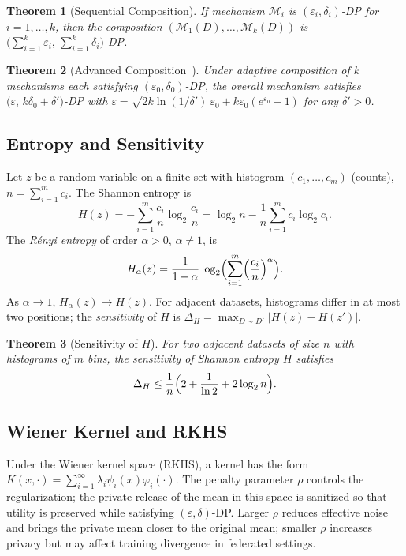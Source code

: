 \documentclass[journal,transmag]{IEEEtran}
\newtheorem{theorem}{Theorem}%
\begin{document}
\begin{theorem}[Sequential Composition]\label{thm1}
If mechanism $\mathcal{M}_i$ is $(\varepsilon_i,\delta_i)$-DP for $i=1,\ldots,k$, then the composition $(\mathcal{M}_1(D),\ldots,\mathcal{M}_k(D))$ is $\bigl(\sum_{i=1}^k \varepsilon_i,\, \sum_{i=1}^k \delta_i\bigr)$-DP.
\end{theorem}

\begin{theorem}[Advanced Composition~\cite{dwork2014algorithmic}]\label{thm2}
Under adaptive composition of $k$ mechanisms each satisfying $(\varepsilon_0,\delta_0)$-DP, the overall mechanism satisfies $\bigl(\varepsilon,\, k\delta_0 + \delta'\bigr)$-DP with $\varepsilon = \sqrt{2k\ln(1/\delta')}\,\varepsilon_0 + k\varepsilon_0(e^{\varepsilon_0}-1)$ for any $\delta'>0$.
\end{theorem}

\subsection{Entropy and Sensitivity}
Let $z$ be a random variable on a finite set with histogram $(c_1,\ldots,c_m)$ (counts), $n=\sum_{i=1}^m c_i$. The Shannon entropy is
\begin{equation}
H(z) = -\sum_{i=1}^m \frac{c_i}{n} \log_2 \frac{c_i}{n} = \log_2 n - \frac{1}{n}\sum_{i=1}^m c_i\log_2 c_i.
\end{equation}
The \emph{R\'enyi entropy} of order $\alpha>0$, $\alpha\neq 1$, is
\begin{equation}
H_\alpha(z) = \frac{1}{1-\alpha}\log_2 \Bigl(\sum_{i=1}^m \Bigl(\frac{c_i}{n}\Bigr)^\alpha\Bigr).
\end{equation}
As $\alpha\to 1$, $H_\alpha(z)\to H(z)$. For adjacent datasets, histograms differ in at most two positions; the \emph{sensitivity} of $H$ is $\Delta_H = \max_{D\sim D'} |H(z)-H(z')|$.

\begin{theorem}[Sensitivity of $H$]\label{thm4}
For two adjacent datasets of size $n$ with histograms of $m$ bins, the sensitivity of Shannon entropy $H$ satisfies
\begin{equation}
\Delta_H \leq \frac{1}{n}\Bigl(2 + \frac{1}{\ln 2} + 2\log_2 n\Bigr).
\end{equation}
\end{theorem}

\subsection{Wiener Kernel and RKHS}
Under the Wiener kernel space (RKHS), a kernel has the form $K(x,\cdot) = \sum_{i=1}^\infty \lambda_i \psi_i(x)\varphi_i(\cdot)$. The penalty parameter $\rho$ controls the regularization; the private release of the mean in this space is sanitized so that utility is preserved while satisfying $(\varepsilon,\delta)$-DP. Larger $\rho$ reduces effective noise and brings the private mean closer to the original mean; smaller $\rho$ increases privacy but may affect training divergence in federated settings.
\end{document}
